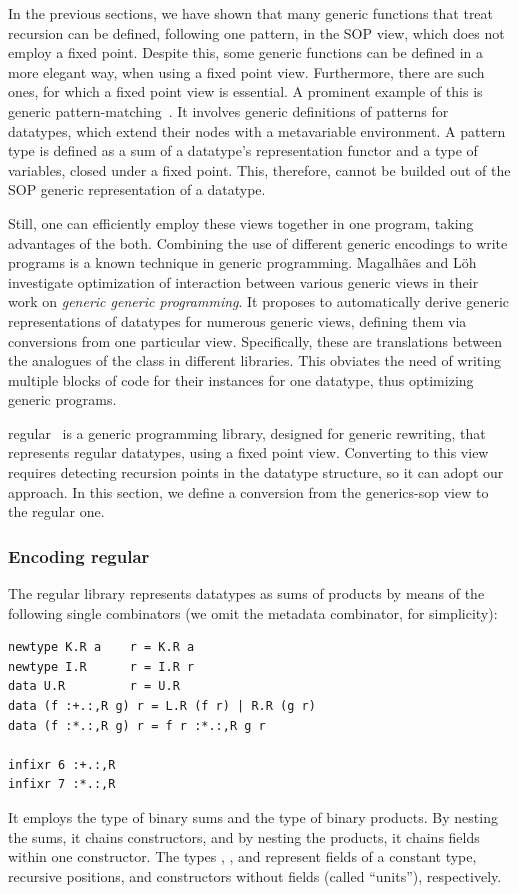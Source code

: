 \documentclass[sigplan,screen,review,anonymous]{acmart}
\begin{document}
In the previous sections, we have shown that many generic functions that treat recursion can be defined, following one pattern, in the SOP view, which does not employ a fixed point. Despite this, some generic functions can be defined in a more elegant way, when using a fixed point view. Furthermore, there are such ones, for which a fixed point view is essential. A prominent example of this is generic pattern-matching~\cite{VanNoort2008}. It involves generic definitions of patterns for datatypes, which extend their nodes with a metavariable environment. A pattern type is defined as a sum of a datatype's representation functor and a type of variables, closed under a fixed point. This, therefore, cannot be builded out of the SOP generic representation of a datatype.

Still, one can efficiently employ these views together in one program, taking advantages of the both. Combining the use of different generic encodings to write programs is a known technique in generic programming. Magalh{\~a}es and L{\"o}h~\cite{MagLoeh2014} investigate optimization of interaction between various generic views in their work on \emph{generic generic programming}. It proposes to automatically derive generic representations of datatypes for numerous generic views, defining them via conversions from one particular view. Specifically, these are translations between the analogues of the  class in different libraries. This obviates the need of writing multiple blocks of code for their instances for one datatype, thus optimizing generic programs.

\textsf{regular}~\cite{VanNoort2008} is a generic programming library, designed for generic rewriting, that represents regular datatypes, using a fixed point view. Converting to this view requires detecting recursion points in the datatype structure, so it can adopt our approach. In this section, we define a conversion from the \textsf{generics-sop} view to the \textsf{regular} one.

\subsubsection{Encoding \textsf{\textmd{regular}}}

The \textsf{regular} library represents datatypes as sums of products by means of the following single combinators (we omit the metadata combinator, for simplicity):
\begin{lstlisting}[style=fancy]
newtype K.R a    r = K.R a
newtype I.R      r = I.R r
data U.R         r = U.R
data (f :+.:,R g) r = L.R (f r) | R.R (g r)
data (f :*.:,R g) r = f r :*.:,R g r

infixr 6 :+.:,R
infixr 7 :*.:,R
\end{lstlisting}
It employs the type  of binary sums and the type  of binary products. By nesting the sums, it chains constructors, and by nesting the products, it chains fields within one constructor. The types , , and  represent fields of a constant type, recursive positions, and constructors without fields (called ``units''), respectively.
\end{document}
